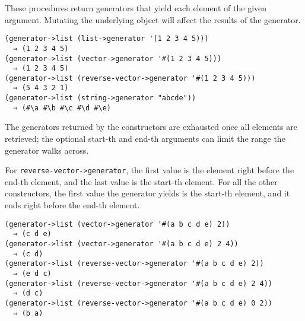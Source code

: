 \begin{entry}{%
  } 

 These procedures return generators that yield each element of
  the given argument. Mutating the underlying object will affect the
  results of the generator.

\begin{verbatim}
(generator->list (list->generator '(1 2 3 4 5)))
  ⇒ (1 2 3 4 5)
(generator->list (vector->generator '#(1 2 3 4 5)))
  ⇒ (1 2 3 4 5)
(generator->list (reverse-vector->generator '#(1 2 3 4 5)))
  ⇒ (5 4 3 2 1)
(generator->list (string->generator "abcde"))
  ⇒ (#\a #\b #\c #\d #\e)
\end{verbatim}

The generators returned by the constructors are exhausted once all
elements are retrieved; the optional start-th and end-th arguments can
limit the range the generator walks across.

For \texttt{reverse-vector->generator}, the first value is the element
right before the end-th element, and the last value is the start-th
element. For all the other constructors, the first value the generator
yields is the start-th element, and it ends right before the end-th
element.

\begin{verbatim}
(generator->list (vector->generator '#(a b c d e) 2))
  ⇒ (c d e)
(generator->list (vector->generator '#(a b c d e) 2 4))
  ⇒ (c d)
(generator->list (reverse-vector->generator '#(a b c d e) 2))
  ⇒ (e d c)
(generator->list (reverse-vector->generator '#(a b c d e) 2 4))
  ⇒ (d c)
(generator->list (reverse-vector->generator '#(a b c d e) 0 2))
  ⇒ (b a)
\end{verbatim}
\end{entry}

